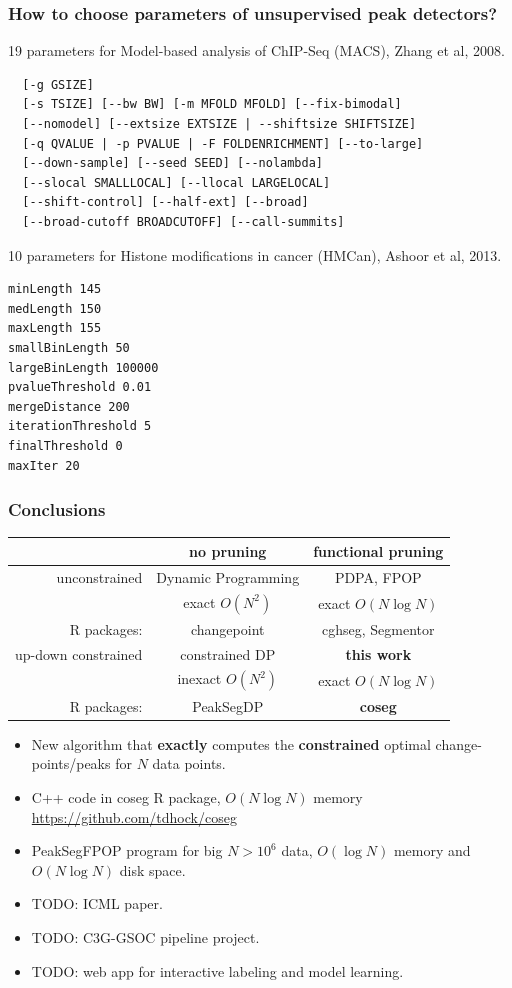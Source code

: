 \documentclass{beamer}
\begin{document}
\begin{frame}[fragile]
  \frametitle{How to choose parameters of unsupervised peak
    detectors?}
\scriptsize
19 parameters for Model-based analysis of ChIP-Seq (MACS), Zhang et al, 2008.
\begin{verbatim}
  [-g GSIZE]
  [-s TSIZE] [--bw BW] [-m MFOLD MFOLD] [--fix-bimodal]
  [--nomodel] [--extsize EXTSIZE | --shiftsize SHIFTSIZE]
  [-q QVALUE | -p PVALUE | -F FOLDENRICHMENT] [--to-large]
  [--down-sample] [--seed SEED] [--nolambda]
  [--slocal SMALLLOCAL] [--llocal LARGELOCAL]
  [--shift-control] [--half-ext] [--broad]
  [--broad-cutoff BROADCUTOFF] [--call-summits]
\end{verbatim}
10 parameters for Histone modifications in cancer (HMCan),
Ashoor et al, 2013.
\begin{verbatim}
minLength 145
medLength 150
maxLength 155
smallBinLength 50
largeBinLength 100000
pvalueThreshold 0.01
mergeDistance 200
iterationThreshold 5
finalThreshold 0
maxIter 20
\end{verbatim}
\end{frame}

  

\begin{frame}
  \frametitle{Conclusions}
  \begin{tabular}{r|c|c}
    & no pruning & functional pruning \\
    \hline
    unconstrained & Dynamic Programming & PDPA, FPOP \\
     & exact $O(N^2)$ & exact $O(N\log N)$\\
    R packages: & changepoint & cghseg, Segmentor\\
    \hline
    up-down constrained & constrained DP & \textbf{this work} \\
     & inexact $O(N^2)$ & exact $O(N\log N)$\\
    R packages: & PeakSegDP & \textbf{coseg}\\
    \hline
  \end{tabular}
  \begin{itemize}
  \item New algorithm that \textbf{exactly} computes the
    \textbf{constrained} optimal change-points/peaks for $N$ data points.
  \item C++ code in coseg R package, $O(N \log N)$ memory
    \url{https://github.com/tdhock/coseg}
  \item PeakSegFPOP program for big $N > 10^6$ data,
    $O(\log N)$ memory and $O(N\log N)$ disk space.
  \item TODO: ICML paper.
  \item TODO: C3G-GSOC pipeline project.
  \item TODO: web app for interactive labeling and model learning.
  \end{itemize}
\end{frame}
\end{document}
